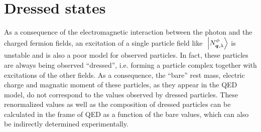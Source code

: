 \documentclass[10pt,a4paper,twoside,openany]{book}
\begin{document}
\section{Dressed states}

As a consequence of the electromagnetic interaction between the photon and the charged fermion fields, an excitation of a single particle field like $\ \left|{{N}^{\phi}_{{\boldsymbol{q}}, {\lambda}}}\right\rangle$ is unstable and is also a poor model for observed particles. In fact, these particles are always being observed ``dressed'', i.e. forming a particle complex together with excitations of the other fields. As a consequence, the ``bare'' rest mass, electric charge and magnatic moment of these particles, as they appear in the QED model, do not correspond to the values observed by dressed particles. These renormalized values as well as the composition of dressed particles can be calculated in the frame of QED as a function of the bare values, which can also be indirectly determined experimentally.
\end{document}
